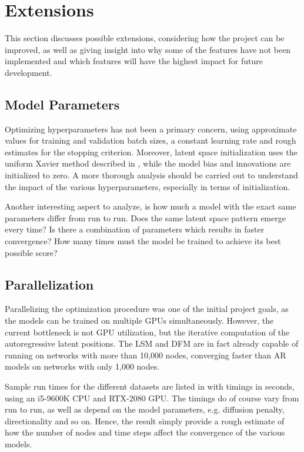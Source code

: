 \section{Extensions}

This section discusses possible extensions, considering how the project can be improved, as well as giving insight into why some of the features have not been implemented and which features will have the highest impact for future development.

\subsection{Model Parameters}

    Optimizing hyperparameters has not been a primary concern, using approximate values for training and validation batch sizes, a constant learning rate and rough estimates for the stopping criterion.
    Moreover, latent space initialization uses the uniform Xavier method described in \cite{glorot2011understanding}, while the model bias and innovations are initialized to zero. 
    A more thorough analysis should be carried out to understand the impact of the various hyperparameters, especially in terms of initialization.
    
    Another interesting aspect to analyze, is how much a model with the exact same parameters differ from run to run. Does the same latent space pattern emerge every time? Is there a combination of parameters which results in faster convergence?
    How many times must the model be trained to achieve its best possible score?
    
\subsection{Parallelization}

    Parallelizing the optimization procedure was one of the initial project goals, as the models can be trained on multiple GPUs simultaneously.
    However, the current bottleneck is not GPU utilization, but the iterative computation of the autoregressive latent positions. The LSM and DFM are in fact already capable of running on networks with more than 10,000 nodes, converging faster than AR models on networks with only 1,000 nodes.
    
    Sample run times for the different datasets are listed in  with timings in seconds, using an i5-9600K CPU and RTX-2080 GPU. The timings do of course vary from run to run, as well as depend on the model parameters, e.g. diffusion penalty, directionality and so on. Hence, the result simply provide a rough estimate of how the number of nodes and time steps affect the convergence of the various models.
    

